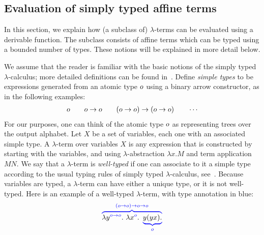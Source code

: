 \subsection{Evaluation of simply typed affine terms}
\label{sec:one-register}

In this section, we explain how (a subclass of) $\lambda$-terms can be evaluated using a derivable function. The subclass consists of affine terms which can be typed using a bounded number of types. These notions will be explained in more detail below.  



We assume that the reader is familiar with the basic notions of the simply typed $\lambda$-calculus; more detailed definitions can be found in~\cite{sorensen_lectures_2006}. 
Define  \emph{simple types} to be expressions  generated from an atomic type $o$ using a binary arrow constructor, as in the following examples:
\begin{align*}
    o \qquad o \to o \qquad (o \to o) \to (o \to o) \qquad \cdots 
\end{align*}
For our purposes, one can think of the atomic type $o$ as representing trees over the output alphabet.
Let $X$ be a set of variables, each one with an associated simple type.  A $\lambda$-term over variables $X$ is any expression that is constructed by starting with the variables, and using $\lambda$-abstraction $\lambda x. M$ and term application $M N$. 
We say that a $\lambda$-term is \emph{well-typed} if one can associate  to it  a simple type according to the usual typing rules of simply typed $\lambda$-calculus,
see~\cite[Definition 3.2.1]{sorensen_lectures_2006}. Because variables are typed, a  $\lambda$-term can have either a unique type, or it is not well-typed.  Here is an example of a well-typed $\lambda$-term, with type annotation in blue: 
\begin{align*}
    {\color{blue}\overbrace{
        {\color{black}\lambda {y}^{{\color{blue}o\to o}}. \ \lambda {x}^{{\color{blue}o}}.}  \ \underbrace{{\color{black}y (y x).}}_{o}}^{(o\to o) \to o\to o}}
    \end{align*}

    
